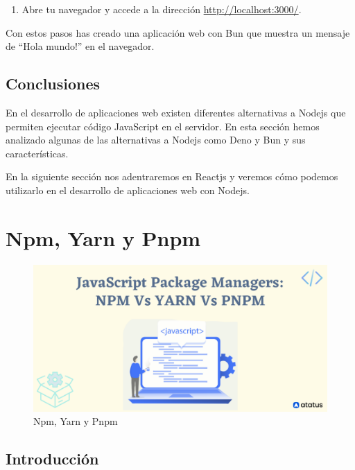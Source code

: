 \documentclass[
  a4paper,
  DIV=11,
  numbers=noendperiod,
  onepage,
  openany]{scrreprt}
\providecommand{\tightlist}{%
  \setlength{\itemsep}{0pt}\setlength{\parskip}{0pt}}\usepackage{longtable,booktabs,array}
\begin{document}
\begin{tcolorbox}
\begin{enumerate}
\def\labelenumi{\arabic{enumi}.}
\setcounter{enumi}{2}
\tightlist
\item
  Abre tu navegador y accede a la dirección
  \url{http://localhost:3000/}.
\end{enumerate}

Con estos pasos has creado una aplicación web con Bun que muestra un
mensaje de ``Hola mundo!'' en el navegador.

\section{Conclusiones}\label{conclusiones-3}

En el desarrollo de aplicaciones web existen diferentes alternativas a
Nodejs que permiten ejecutar código JavaScript en el servidor. En esta
sección hemos analizado algunas de las alternativas a Nodejs como Deno y
Bun y sus características.

En la siguiente sección nos adentraremos en Reactjs y veremos cómo
podemos utilizarlo en el desarrollo de aplicaciones web con Nodejs.

\chapter{Npm, Yarn y Pnpm}\label{npm-yarn-y-pnpm}

\begin{figure}[H]

{\centering \includegraphics{images/npm-vs-yarn-vs-pnpm-1.png}

}

\caption{Npm, Yarn y Pnpm}

\end{figure}%

\section{Introducción}\label{introducciuxf3n-2}


\end{tcolorbox}
\end{document}
